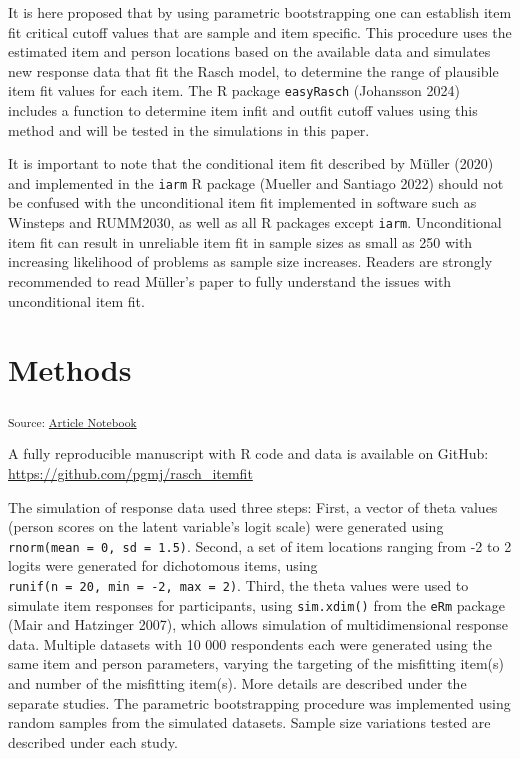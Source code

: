\documentclass[
  letterpaper,
  DIV=11,
  numbers=noendperiod]{scrartcl}
\begin{document}
It is here proposed that by using parametric bootstrapping one can
establish item fit critical cutoff values that are sample and item
specific. This procedure uses the estimated item and person locations
based on the available data and simulates new response data that fit the
Rasch model, to determine the range of plausible item fit values for
each item. The R package \texttt{easyRasch} (Johansson 2024) includes a
function to determine item infit and outfit cutoff values using this
method and will be tested in the simulations in this paper.

It is important to note that the conditional item fit described by
Müller (2020) and implemented in the \texttt{iarm} R package (Mueller
and Santiago 2022) should not be confused with the unconditional item
fit implemented in software such as Winsteps and RUMM2030, as well as
all R packages except \texttt{iarm}. Unconditional item fit can result
in unreliable item fit in sample sizes as small as 250 with increasing
likelihood of problems as sample size increases. Readers are strongly
recommended to read Müller's paper to fully understand the issues with
unconditional item fit.

\section{Methods}\label{methods}

\textsubscript{Source:
\href{https://pgmj.github.io/rasch_itemfit/index.qmd.html}{Article
Notebook}}

A fully reproducible manuscript with R code and data is available on
GitHub: \url{https://github.com/pgmj/rasch_itemfit}

The simulation of response data used three steps: First, a vector of
theta values (person scores on the latent variable's logit scale) were
generated using \texttt{rnorm(mean\ =\ 0,\ sd\ =\ 1.5)}. Second, a set
of item locations ranging from -2 to 2 logits were generated for
dichotomous items, using
\texttt{runif(n\ =\ 20,\ min\ =\ -2,\ max\ =\ 2)}. Third, the theta
values were used to simulate item responses for participants, using
\texttt{sim.xdim()} from the \texttt{eRm} package (Mair and Hatzinger
2007), which allows simulation of multidimensional response data.
Multiple datasets with 10 000 respondents each were generated using the
same item and person parameters, varying the targeting of the misfitting
item(s) and number of the misfitting item(s). More details are described
under the separate studies. The parametric bootstrapping procedure was
implemented using random samples from the simulated datasets. Sample
size variations tested are described under each study.
\end{document}
